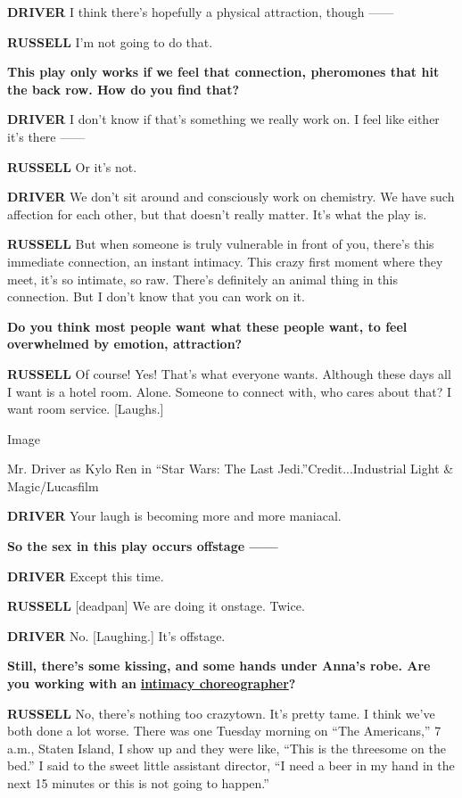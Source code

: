 \textbf{DRIVER} I think there's hopefully a physical attraction, though
------

\textbf{RUSSELL} I'm not going to do that.

\textbf{This play only works if we feel that connection, pheromones that
hit the back row. How do you find that?}

\textbf{DRIVER} I don't know if that's something we really work on. I
feel like either it's there ------

\textbf{RUSSELL} Or it's not.

\textbf{DRIVER} We don't sit around and consciously work on chemistry.
We have such affection for each other, but that doesn't really matter.
It's what the play is.

\textbf{RUSSELL} But when someone is truly vulnerable in front of you,
there's this immediate connection, an instant intimacy. This crazy first
moment where they meet, it's so intimate, so raw. There's definitely an
animal thing in this connection. But I don't know that you can work on
it.

\textbf{Do you think most people want what these people want, to feel
overwhelmed by emotion, attraction?}

\textbf{RUSSELL} Of course! Yes! That's what everyone wants. Although
these days all I want is a hotel room. Alone. Someone to connect with,
who cares about that? I want room service. {[}Laughs.{]}

Image

Mr. Driver as Kylo Ren in ``Star Wars: The Last
Jedi.''Credit...Industrial Light \& Magic/Lucasfilm

\textbf{DRIVER} Your laugh is becoming more and more maniacal.

\textbf{So the sex in this play occurs offstage ------}

\textbf{DRIVER} Except this time.

\textbf{RUSSELL} {[}deadpan{]} We are doing it onstage. Twice.

\textbf{DRIVER} No. {[}Laughing.{]} It's offstage.

\textbf{Still, there's some kissing, and some hands under Anna's robe.
Are you working with an}
\textbf{\href{https://www.nytimes3xbfgragh.onion/2017/06/15/theater/need-to-fake-an-orgasm-theres-an-intimacy-choreographer-for-that.html}{intimacy
choreographer}?}

\textbf{RUSSELL} No, there's nothing too crazytown. It's pretty tame. I
think we've both done a lot worse. There was one Tuesday morning on
``The Americans,'' 7 a.m., Staten Island, I show up and they were like,
``This is the threesome on the bed.'' I said to the sweet little
assistant director, ``I need a beer in my hand in the next 15 minutes or
this is not going to happen.''


